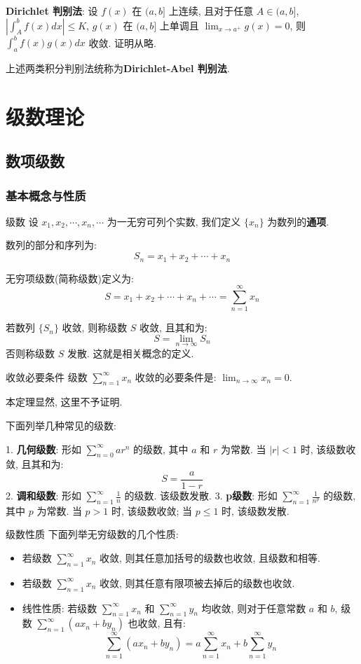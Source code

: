 \documentclass[a4paper,12pt]{ctexart}
\begin{document}
\textbf{Dirichlet 判别法}: 设 $f(x)$ 在 $(a,b]$ 上连续, 且对于任意 $A \in (a,b]$, $\left| \int_A^b f(x) dx \right| \le K$, $g(x)$ 在 $(a,b]$ 上单调且 $\lim_{x \to a^+} g(x) = 0$, 则 $\int_a^{b} f(x)g(x) dx$ 收敛. 证明从略.

上述两类积分判别法统称为\textbf{Dirichlet-Abel 判别法}.

\section{级数理论}

\subsection{数项级数}

\subsubsection{基本概念与性质}

\begin{mydef}{级数}{}
设 $x_1, x_2, \cdots, x_n, \cdots$ 为一无穷可列个实数, 我们定义 $\{x_n\}$ 为数列的\textbf{通项}.

数列的部分和序列为:
$$
S_n = x_1 + x_2 + \cdots + x_n
$$

无穷项级数(简称级数)定义为:
$$
S= x_1 + x_2 + \cdots + x_n + \cdots = \sum_{n=1}^{\infty} x_n
$$

若数列 $\{S_n\}$ 收敛, 则称级数 $S$ 收敛, 且其和为:
$$
S = \lim_{n \to \infty} S_n
$$
否则称级数 $S$ 发散. 这就是相关概念的定义.
\end{mydef}

\begin{mythm}{收敛必要条件}{}
级数 $\sum_{n=1}^{\infty} x_n$ 收敛的必要条件是: $\lim_{n \to \infty} x_n = 0$.
\end{mythm}
本定理显然, 这里不予证明.

下面列举几种常见的级数:

1. \textbf{几何级数}: 形如 $\sum_{n=0}^{\infty} ar^n$ 的级数, 其中 $a$ 和 $r$ 为常数. 当 $|r| < 1$ 时, 该级数收敛, 且其和为:
$$
S = \frac{a}{1-r}
$$
2. \textbf{调和级数}: 形如 $\sum_{n=1}^{\infty} \frac{1}{n}$ 的级数. 该级数发散.
3. \textbf{p级数}: 形如 $\sum_{n=1}^{\infty} \frac{1}{n^p}$ 的级数, 其中 $p$ 为常数.
   当 $p > 1$ 时, 该级数收敛; 当 $p \leq 1$ 时, 该级数发散.

\begin{myprop}{级数性质}{}
下面列举无穷级数的几个性质:
\begin{itemize}
    \item 若级数 $\sum_{n=1}^{\infty} x_n$ 收敛, 则其任意加括号的级数也收敛, 且级数和相等.
    \item 若级数 $\sum_{n=1}^{\infty} x_n$ 收敛, 则其任意有限项被去掉后的级数也收敛.
    \item 线性性质: 若级数 $\sum_{n=1}^{\infty} x_n$ 和 $\sum_{n=1}^{\infty} y_n$ 均收敛, 则对于任意常数 $a$ 和 $b$, 级数 $\sum_{n=1}^{\infty} (a x_n + b y_n)$ 也收敛, 且有:
$$
\sum_{n=1}^{\infty} (a x_n + b y_n) = a \sum_{n=1}^{\infty} x_n + b \sum_{n=1}^{\infty} y_n
$$
\end{itemize}
\end{myprop}
\end{document}

